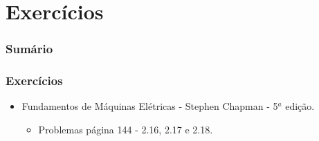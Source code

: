 \documentclass[mathserif,usenames,dvipsnames]{beamer}
\begin{document}
\section{Exercícios}
\begin{frame}
\frametitle{Sumário}
\tableofcontents[currentsection]
\end{frame}

\begin{frame}
\frametitle{Exercícios}
	\begin{itemize}
		\item Fundamentos de Máquinas Elétricas - Stephen Chapman - 5$^a$ edição.
		\begin{itemize}
			\item Problemas página 144 - 2.16, 2.17 e 2.18.
		\end{itemize}	
	\end{itemize}
	
\end{frame}


%		
\end{document}
